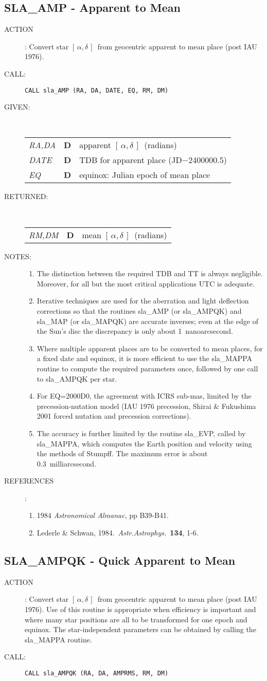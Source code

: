 \documentclass[11pt,twoside]{article}
\newcommand{\xlabel}[1]{}
\newcommand{\radec}     {$[\,\alpha,\delta\,]$}
\newcommand{\routine}[3]
{\hbadness=10000
  \vbox
  {
    \rule{\textwidth}{0.3mm}\\
    {\Large {\bf #1} \hfill #2 \hfill {\bf #1}}\\
    \setlength{\oldspacing}{\topsep}
    \setlength{\topsep}{0.3ex}
    \begin{description}
      #3
    \end{description}
    \setlength{\topsep}{\oldspacing}
  }
}
\renewcommand{\routine}[3]
   {
      \subsection{#1\xlabel{#1} - #2\label{#1}}
       \begin{description}
         #3
       \end{description}
   }
\newcommand{\action}[1]
{\item[ACTION]: #1}
\newcommand{\action}[1]
   {\item[ACTION:] #1}
\newcommand{\call}[1]
{\item[CALL]: \hspace{0.4em}{\tt #1}}
\newlength{\oldspacing}
\renewcommand{\call}[1]
   {
    \item[CALL:] {\tt #1}
   }
\newcommand{\args}[2]
{
  \goodbreak
  \setlength{\oldspacing}{\topsep}
  \setlength{\topsep}{0.3ex}
  \begin{description}
  \item[#1]:\\[1.5ex]
    \begin{tabular}{p{7em}p{6em}p{22em}}
      #2
    \end{tabular}
  \end{description}
  \setlength{\topsep}{\oldspacing}
}
\renewcommand{\args}[2]
   {
     \begin{description}
        \item[#1:]\\
        \begin{tabular}{p{7em}p{6em}l}
           #2
        \end{tabular}
     \end{description}
   }
\newcommand{\spec}[3]
{
  {\em {#1}} & {\bf \mbox{#2}} & {#3}
}
\newcommand{\notes}[1]
{
  \goodbreak
  \setlength{\oldspacing}{\topsep}
  \setlength{\topsep}{0.3ex}
  \begin{description}
    \item[NOTES]:
        #1
  \end{description}
  \setlength{\topsep}{\oldspacing}
}
\renewcommand{\notes}[1]
   {
      \begin{description}
         \item[NOTES:]
            #1
      \end{description}
   }
\newcommand{\refs}[1]
{
  \goodbreak
  \setlength{\oldspacing}{\topsep}
  \setlength{\topsep}{0.3ex}
  \begin{description}
    \item[REFERENCES]:
        #1
  \end{description}
  \setlength{\topsep}{\oldspacing}
}
\newcommand{\refs}[1]
   {
     \begin{description}
       \item[REFERENCES:]
           #1
     \end{description}
   }
\begin{document}
\routine{SLA\_AMP}{Apparent to Mean}
{
 \action{Convert star \radec\ from geocentric apparent to
         mean place (post IAU 1976).}
 \call{CALL sla\_AMP (RA, DA, DATE, EQ, RM, DM)}
}
\args{GIVEN}
{
 \spec{RA,DA}{D}{apparent \radec\ (radians)} \\
 \spec{DATE}{D}{TDB for apparent place (JD$-$2400000.5)} \\
 \spec{EQ}{D}{equinox:  Julian epoch of mean place}
}
\args{RETURNED}
{
 \spec{RM,DM}{D}{mean \radec\ (radians)}
}
\notes
{
 \begin{enumerate}
  \item The distinction between the required TDB and TT is
        always negligible.  Moreover, for all but the most
        critical applications UTC is adequate.
  \item Iterative techniques are used for the aberration and
        light deflection corrections so that the routines
        sla\_AMP (or sla\_AMPQK) and sla\_MAP (or sla\_MAPQK) are
        accurate inverses;  even at the edge of the Sun's disc
        the discrepancy is only about 1~nanoarcsecond.
  \item Where multiple apparent places are to be converted to
        mean places, for a fixed date and equinox, it is more
        efficient to use the sla\_MAPPA routine to compute the
        required parameters once, followed by one call to
        sla\_AMPQK per star.
  \item For EQ=2000D0,
        the agreement with ICRS sub-mas, limited by the
        precession-nutation model (IAU 1976 precession, Shirai \&
        Fukushima 2001 forced nutation and precession corrections).
  \item The accuracy is further limited by the routine sla\_EVP, called
        by sla\_MAPPA, which computes the Earth position and
        velocity using the methods of Stumpff.  The maximum
        error is about 0.3~milliarcsecond.
 \end{enumerate}
}
\refs
{
 \begin{enumerate}
  \item 1984 {\it Astronomical Almanac}, pp B39-B41.
  \item Lederle \& Schwan, 1984.\ {\it Astr.Astrophys.}\ {\bf 134}, 1-6.
 \end{enumerate}
}
\routine{SLA\_AMPQK}{Quick Apparent to Mean}
{
 \action{Convert star \radec\ from geocentric apparent to mean place
         (post IAU 1976).  Use of this routine is appropriate when
         efficiency is important and where many star positions are
         all to be transformed for one epoch and equinox.  The
         star-independent parameters can be obtained by calling
         the sla\_MAPPA routine.}
 \call{CALL sla\_AMPQK (RA, DA, AMPRMS, RM, DM)}
}
\end{document}

